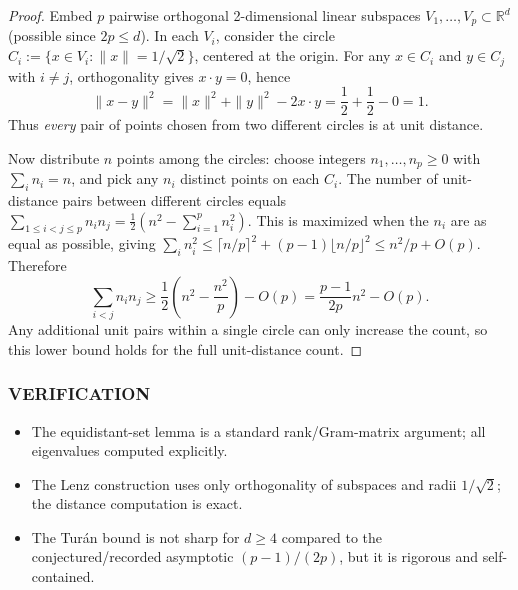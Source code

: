 \begin{proof}
Embed \(p\) pairwise orthogonal 2-dimensional linear subspaces \(V_1,\dots,V_p\subset\mathbb{R}^d\) (possible since \(2p\le d\)).
In each \(V_i\), consider the circle
\(C_i:=\{x\in V_i: \|x\|=1/\sqrt2\}\), centered at the origin.
For any \(x\in C_i\) and \(y\in C_j\) with \(i\ne j\), orthogonality gives \(x\cdot y=0\), hence
\[
\|x-y\|^2=\|x\|^2+\|y\|^2-2x\cdot y = \frac12+\frac12-0=1.
\]
Thus \emph{every} pair of points chosen from two different circles is at unit distance.

Now distribute \(n\) points among the circles: choose integers \(n_1,\dots,n_p\ge 0\) with \(\sum_i n_i=n\), and pick any \(n_i\) distinct points on each \(C_i\).
The number of unit-distance pairs between different circles equals
\(\sum_{1\le i<j\le p} n_i n_j = \frac12\left(n^2-\sum_{i=1}^p n_i^2\right)\).
This is maximized when the \(n_i\) are as equal as possible, giving
\(\sum_i n_i^2\le \lceil n/p\rceil^2+(p-1)\lfloor n/p\rfloor^2\le n^2/p + O(p)\).
Therefore
\[
\sum_{i<j}n_i n_j \ge \frac12\left(n^2-\frac{n^2}{p}\right)-O(p)=\frac{p-1}{2p}n^2-O(p).
\]
Any additional unit pairs within a single circle can only increase the count, so this lower bound holds for the full unit-distance count.
\end{proof}

\subsubsection*{VERIFICATION}
\begin{itemize}
\item The equidistant-set lemma is a standard rank/Gram-matrix argument; all eigenvalues computed explicitly.
\item The Lenz construction uses only orthogonality of subspaces and radii \(1/\sqrt2\); the distance computation is exact.
\item The Tur\'an bound is not sharp for \(d\ge 4\) compared to the conjectured/recorded asymptotic \((p-1)/(2p)\), but it is rigorous and self-contained.
\end{itemize}

